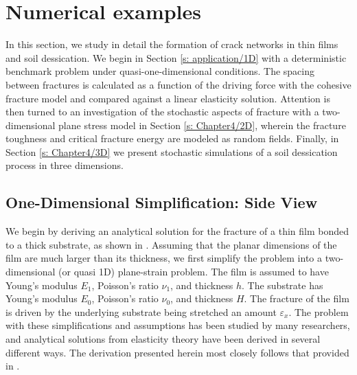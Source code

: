 \section{Numerical examples}
\label{section: cohesive/examples}

In this section, we study in detail the formation of crack networks in thin films and soil dessication.  We begin
in Section \ref{s: application/1D} with a deterministic benchmark problem under quasi-one-dimensional conditions.  The spacing between fractures is calculated as a function of the driving force with the cohesive fracture model and compared against a linear elasticity solution. Attention is then turned to an investigation of the stochastic aspects of fracture with a two-dimensional plane stress model in Section \ref{s: Chapter4/2D}, wherein the fracture toughness and critical fracture energy are modeled as random fields.  Finally, in Section \ref{s: Chapter4/3D} we present stochastic simulations of a soil dessication process in three dimensions.

\subsection{One-Dimensional Simplification: Side View}

We begin by deriving an analytical solution for the fracture of a thin film bonded to a thick substrate, as shown in .  Assuming that the planar dimensions of the film are much larger than its thickness, we first simplify the problem into a two-dimensional (or quasi 1D) plane-strain problem. The film is assumed to have Young's modulus $E_1$, Poisson's ratio $\nu_1$, and thickness $h$. The substrate has Young's modulus $E_0$, Poisson's ratio $\nu_0$, and thickness $H$.  The fracture of the film is driven by the underlying substrate being stretched an amount $\varepsilon_x$.  The problem with these simplifications and assumptions has been studied by many researchers, and analytical solutions from elasticity theory have been derived in several different ways.  The derivation presented herein most closely follows that provided in \citet{yin2008explicit}.

